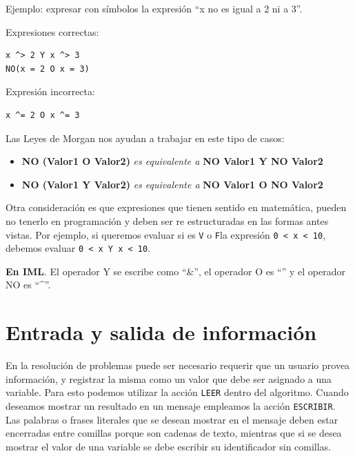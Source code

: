 \documentclass[]{book}
\providecommand{\tightlist}{%
  \setlength{\itemsep}{0pt}\setlength{\parskip}{0pt}}
\begin{document}
Ejemplo: expresar con símbolos la expresión ``x no es igual a 2 ni a 3''.

Expresiones correctas:

\begin{verbatim}
x ^> 2 Y x ^> 3
NO(x = 2 O x = 3)
\end{verbatim}

Expresión incorrecta:

\begin{verbatim}
x ^= 2 O x ^= 3
\end{verbatim}

Las Leyes de Morgan nos ayudan a trabajar en este tipo de casos:

\begin{itemize}
\tightlist
\item
  \textbf{NO (Valor1 O Valor2)} \emph{es equivalente a} \textbf{NO Valor1 Y NO Valor2}
\item
  \textbf{NO (Valor1 Y Valor2)} \emph{es equivalente a} \textbf{NO Valor1 O NO Valor2}
\end{itemize}

Otra consideración es que expresiones que tienen sentido en matemática, pueden no tenerlo en programación y deben ser re estructuradas en las formas antes vistas. Por ejemplo, si queremos evaluar si es \texttt{V} o \texttt{F}la expresión \texttt{0\ \textless{}\ x\ \textless{}\ 10}, debemos evaluar \texttt{0\ \textless{}\ x\ Y\ x\ \textless{}\ 10}.

\textbf{En IML}. El operador Y se escribe como ``\&'', el operador O es ``\textbar{}'' y el operador NO es ``\^{}''.

\hypertarget{entrada-y-salida-de-informacion}{%
\section{Entrada y salida de información}\label{entrada-y-salida-de-informacion}}

En la resolución de problemas puede ser necesario requerir que un usuario provea información, y registrar la misma como un valor que debe ser asignado a una variable. Para esto podemos utilizar la acción \texttt{LEER} dentro del algoritmo. Cuando deseamos mostrar un resultado en un mensaje empleamos la acción \texttt{ESCRIBIR}. Las palabras o frases literales que se desean mostrar en el mensaje deben estar encerradas entre comillas porque son cadenas de texto, mientras que si se desea mostrar el valor de una variable se debe escribir su identificador sin comillas.
\end{document}
